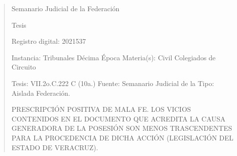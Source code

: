 \documentclass[11pt,a4paper]{article}
\begin{document}
\begin{quote}
                                                   Semanario Judicial de la Federación

                                                Tesis

 Registro digital: 2021537

 Instancia: Tribunales             Décima Época                           Materia(s): Civil
 Colegiados de Circuito

 Tesis: VII.2o.C.222 C (10a.)      Fuente: Semanario Judicial de la       Tipo: Aislada
                                   Federación.


PRESCRIPCIÓN POSITIVA DE MALA FE. LOS VICIOS CONTENIDOS EN EL DOCUMENTO QUE
ACREDITA LA CAUSA GENERADORA DE LA POSESIÓN SON MENOS TRASCENDENTES
PARA LA PROCEDENCIA DE DICHA ACCIÓN (LEGISLACIÓN DEL ESTADO DE VERACRUZ).



\end{quote}
\end{document}
